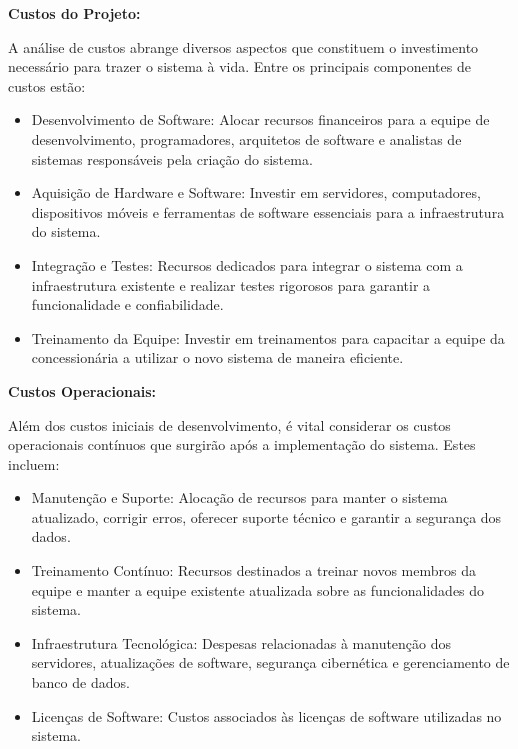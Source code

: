 \textbf{Custos do Projeto:}

A análise de custos abrange diversos aspectos que constituem o investimento necessário para trazer o sistema à vida. Entre os principais componentes de custos estão:

\begin{itemize}
	\item Desenvolvimento de Software: Alocar recursos financeiros para a equipe de desenvolvimento, programadores, arquitetos de software e analistas de sistemas responsáveis pela criação do sistema.
	
	\item Aquisição de Hardware e Software: Investir em servidores, computadores, dispositivos móveis e ferramentas de software essenciais para a infraestrutura do sistema.
	
	\item Integração e Testes: Recursos dedicados para integrar o sistema com a infraestrutura existente e realizar testes rigorosos para garantir a funcionalidade e confiabilidade.
	
	\item Treinamento da Equipe: Investir em treinamentos para capacitar a equipe da concessionária a utilizar o novo sistema de maneira eficiente.\\
	
\end{itemize}

\textbf{Custos Operacionais:}

Além dos custos iniciais de desenvolvimento, é vital considerar os custos operacionais contínuos que surgirão após a implementação do sistema. Estes incluem:

\begin{itemize}
	\item Manutenção e Suporte: Alocação de recursos para manter o sistema atualizado, corrigir erros, oferecer suporte técnico e garantir a segurança dos dados.
	
	\item Treinamento Contínuo: Recursos destinados a treinar novos membros da equipe e manter a equipe existente atualizada sobre as funcionalidades do sistema.
	
	\item Infraestrutura Tecnológica: Despesas relacionadas à manutenção dos servidores, atualizações de software, segurança cibernética e gerenciamento de banco de dados.
	
	\item Licenças de Software: Custos associados às licenças de software utilizadas no sistema.\\
\end{itemize}

